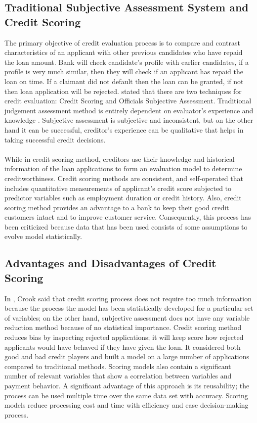 {\subsection{Traditional Subjective Assessment System and Credit Scoring}\label{C.risk2}
The primary objective of credit evaluation process is to compare and contrast characteristics of an applicant with other previous candidates who have repaid the loan amount. Bank will check candidate's profile with earlier candidates, if a profile is very much similar, then they will check if an applicant has repaid the loan on time. If a claimant did not default then the loan can be granted, if not then loan application will be rejected. \citep{crook1996credit} stated that there are two techniques for credit evaluation: Credit Scoring and Officials Subjective Assessment. Traditional judgement assessment method is entirely dependent on evaluator's experience and knowledge \citep{sullivan1981consumer,bailey2004consumer}. Subjective assessment is subjective and inconsistent, but on the other hand it can be successful, creditor's experience can be qualitative that helps in taking successful credit decisions.\\\\
While in credit scoring method, creditors use their knowledge and historical information of the loan applications to form an evaluation model to determine creditworthiness. Credit scoring methods are consistent, and self-operated that includes quantitative measurements of applicant's credit score subjected to predictor variables such as employment duration or credit history. Also, credit scoring method provides an advantage to a bank to keep their good credit customers intact and to improve customer service. Consequently, this process has been criticized because data that has been used consists of some assumptions to evolve model statistically. 

\subsection{Advantages and Disadvantages of Credit Scoring}
In \citep{crook1996credit}, Crook said that credit scoring process does not require too much information because the process the model has been statistically developed for a particular set of variables; on the other hand, subjective assessment does not have any variable reduction method because of no statistical importance. Credit scoring method reduces bias by inspecting rejected applications; it will keep score how rejected applicants would have behaved if they have given the loan. It considered both good and bad credit players and built a model on a large number of applications compared to traditional methods. Scoring models also contain a significant number of relevant variables that show a correlation between variables and payment behavior. A significant advantage of this approach is its reusability; the process can be used multiple time over the same data set with accuracy. Scoring models reduce processing cost and time with efficiency and ease decision-making process.\\

}

